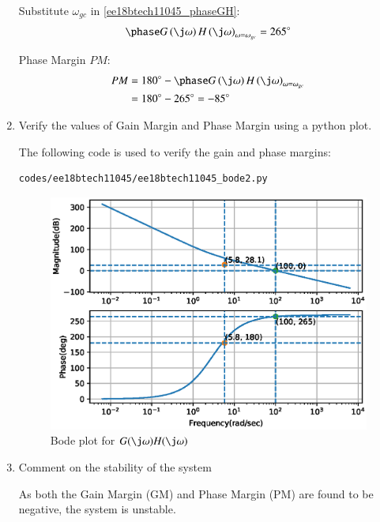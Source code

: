 \begin{enumerate}[label=\thesubsection.\arabic*.,ref=\thesubsection.\theenumi]
Substitute $\omega_{gc}$ in \eqref{ee18btech11045_phaseGH}:
\begin{align}
    \phase G\brak{\j\omega}H\brak{\j\omega}_{\omega = \omega_{gc}} = 265\degree
\end{align}

Phase Margin {$PM$}:
\begin{align}
    PM &= 180\degree - \phase G\brak{\j\omega}H\brak{\j\omega}_{\omega = \omega_{gc}}
    \\
    &= 180\degree - 265\degree = - 85\degree
\end{align}


\item Verify the values of Gain Margin and Phase Margin using a python plot.

\solution

The following code is used to verify the gain and phase margins:
\begin{lstlisting}
codes/ee18btech11045/ee18btech11045_bode2.py
\end{lstlisting}

\begin{figure}[!ht]
\centering
\includegraphics[width=\columnwidth]{./figs/ee18btech11045/ee18btech11045_bode2.eps}
\caption{Bode plot for $G(\j\omega)H(\j\omega)$}
\label{fig:ee18btech11045_bode2}
\end{figure}


\item Comment on the stability of the system

\solution

As both the Gain Margin (GM) and Phase Margin (PM) are found to be negative, the system is unstable.

\end{enumerate}
